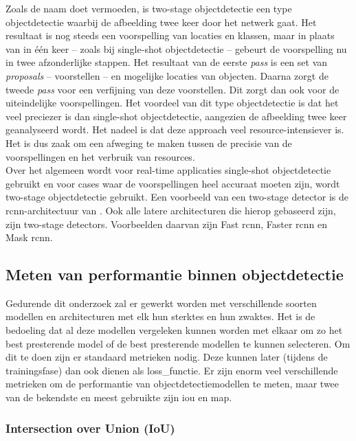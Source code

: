 Zoals de naam doet vermoeden, is two-stage objectdetectie een type objectdetectie waarbij de afbeelding twee keer door het netwerk gaat. Het resultaat is nog steeds een voorspelling van locaties en klassen, maar in plaats van in één keer -- zoals bij single-shot objectdetectie -- gebeurt de voorspelling nu in twee afzonderlijke stappen. Het resultaat van de eerste \emph{pass} is een set van \emph{proposals} -- voorstellen -- en mogelijke locaties van objecten. Daarna zorgt de tweede \emph{pass} voor een verfijning van deze voorstellen. Dit zorgt dan ook voor de uiteindelijke voorspellingen. Het voordeel van dit type objectdetectie is dat het veel preciezer is dan single-shot objectdetectie, aangezien de afbeelding twee keer geanalyseerd wordt. Het nadeel is dat deze approach veel resource-intensiever is. Het is dus zaak om een afweging te maken tussen de precisie van de voorspellingen en het verbruik van resources. \autocite{Carranza_Garcia_2020} \\

Over het algemeen wordt voor real-time applicaties single-shot objectdetectie gebruikt en voor cases waar de voorspellingen heel accuraat moeten zijn, wordt two-stage objectdetectie gebruikt. Een voorbeeld van een two-stage detector is de \gls{rcnn}-architectuur van \textcite{Girshick_2013}. Ook alle latere architecturen die hierop gebaseerd zijn, zijn two-stage detectors. Voorbeelden daarvan zijn Fast \gls{rcnn}, Faster \gls{rcnn} en Mask \gls{rcnn}. \autocite{Ren_2015}

\subsection{Meten van performantie binnen objectdetectie}

Gedurende dit onderzoek zal er gewerkt worden met verschillende soorten modellen en architecturen met elk hun sterktes en hun zwaktes. Het is de bedoeling dat al deze modellen vergeleken kunnen worden met elkaar om zo het best presterende model of de best presterende modellen te kunnen selecteren. Om dit te doen zijn er standaard metrieken nodig. Deze kunnen later (tijdens de trainingsfase) dan ook dienen als \gls{loss_functie}. Er zijn enorm veel verschillende metrieken om de performantie van objectdetectiemodellen te meten, maar twee van de bekendste en meest gebruikte zijn \gls{iou} en \gls{map}.

\subsubsection{Intersection over Union (IoU)}

